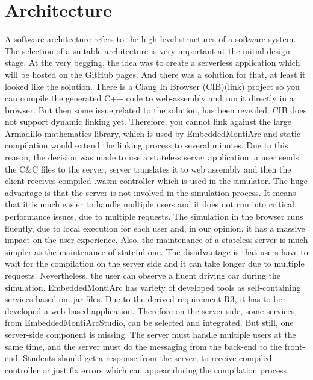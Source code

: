 \section{Architecture}
A software architecture refers to the high-level structures of a software system. The selection of a suitable architecture is very important at the initial design stage. At the very begging, the idea was to create a serverless application which will be hosted on the GitHub pages. And there was a solution for that, at least it looked like the solution. There is a Clang In Browser (CIB)(link) project so you can compile the generated C++ code to web-assembly and run it directly in a browser. But then some issue,related to the solution, has been revealed. CIB does not support dynamic linking yet. Therefore, you cannot link against the large Armadillo mathematics library, which is used by EmbeddedMontiArc and static compilation would extend the linking process to several minutes. Due to this reason, the decision was made to use a stateless server application: a user sends the C\&C files to the server, server translates it to web assembly and then the client receives compiled .wasm controller which is used in the simulator. The huge advantage is that the server is not involved in the simulation process. It means that it is much easier to handle multiple users and it does not run into critical performance issues, due to multiple requests. The simulation in the browser runs fluently, due to local execution for each user and, in our opinion, it has a massive impact on the user experience. Also, the maintenance of a stateless server is much simpler as the maintenance of stateful one. The disadvantage is that users have to wait for the compilation on the server side and it can take longer due to multiple requests. Nevertheless, the user can observe a fluent driving car during the simulation.\newline 
EmbeddedMontiArc has variety of developed tools as self-containing services based on .jar files. Due to the derived requirement R3, it has to be developed a web-based application. Therefore on the server-side, some services, from EmbeddedMontiArcStudio, can be selected and integrated. But still, one server-side component is missing. The server must handle multiple users at the same time, and the server must do the messaging from the back-end to the front-end. Students should get a response from the server, to receive compiled controller or just fix errors which can appear during the compilation process.\newline
